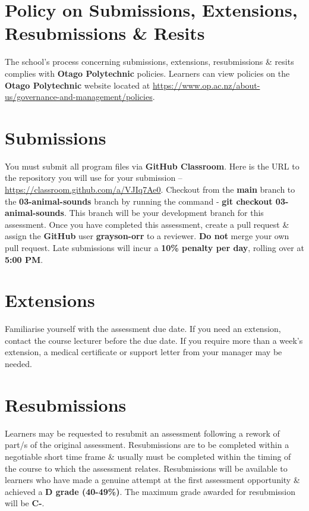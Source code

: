 \documentclass{article}
\begin{document}
\section*{Policy on Submissions, Extensions, Resubmissions \& Resits}
The school's process concerning submissions, extensions, resubmissions \& resits complies with \textbf{Otago Polytechnic} policies. Learners can view policies on the \textbf{Otago Polytechnic} website located at \href{https://www.op.ac.nz/about-us/governance-and-management/policies}{https://www.op.ac.nz/about-us/governance-and-management/policies}.

\section*{Submissions}
You must submit all program files via \textbf{GitHub Classroom}. Here is the URL to the repository you will use for your submission – \href{https://classroom.github.com/a/VJIq7Ae0}{https://classroom.github.com/a/VJIq7Ae0}. Checkout from the \textbf{main} branch to the \textbf{03-animal-sounds} branch by running the command - \textbf{git checkout 03-animal-sounds}. This branch will be your development branch for this assessment. Once you have completed this assessment, create a pull request \& assign the \textbf{GitHub} user \textbf{grayson-orr} to a reviewer. \textbf{Do not} merge your own pull request. Late submissions will incur a \textbf{10\% penalty per day}, rolling over at \textbf{5:00 PM}.

\section*{Extensions}
Familiarise yourself with the assessment due date. If you need an extension, contact the course lecturer before the due date. If you require more than a week's extension, a medical certificate or support letter from your manager may be needed.

\section*{Resubmissions}
Learners may be requested to resubmit an assessment following a rework of part/s of the original assessment. Resubmissions are to be completed within a negotiable short time frame \& usually must be completed within the timing of the course to which the assessment relates. Resubmissions will be available to learners who have made a genuine attempt at the first assessment opportunity \& achieved a \textbf{D grade (40-49\%)}. The maximum grade awarded for resubmission will be \textbf{C-}.
\end{document}
